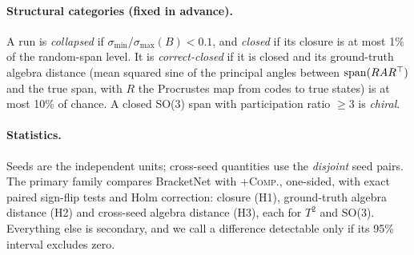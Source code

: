 \paragraph{Structural categories (fixed in advance).}
A run is \emph{collapsed} if $\sigma_{\min}/\sigma_{\max}(B)<0.1$, and \emph{closed} if its closure is at most 1\% of the
random-span level. It is \emph{correct-closed} if it is closed and its ground-truth algebra distance (mean squared sine
of the principal angles between $\operatorname{span}(RAR^\top)$ and the true span, with $R$ the Procrustes map from codes to true
states) is at most 10\% of chance. A closed SO(3) span with participation ratio $\ge3$ is \emph{chiral}.

\paragraph{Statistics.}
Seeds are the independent units; cross-seed quantities use the \NNpairs{} \emph{disjoint} seed pairs. The primary
family compares BracketNet with \textsc{+Comp.}, one-sided, with exact paired sign-flip tests and Holm correction:
closure (H1), ground-truth algebra distance (H2) and cross-seed algebra distance (H3), each for $T^2$ and SO(3).
Everything else is secondary, and we call a difference detectable only if its 95\% interval excludes zero.
